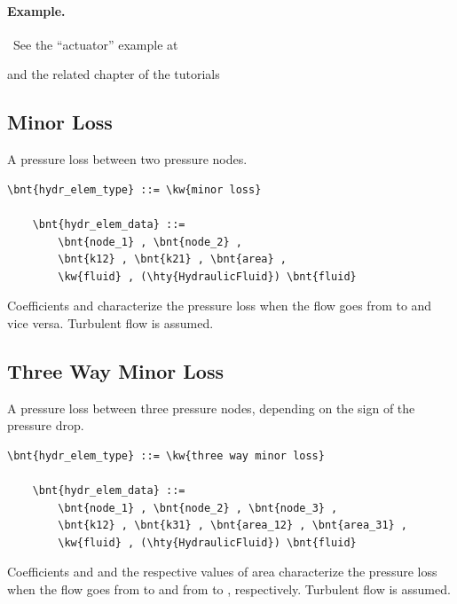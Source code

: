 \paragraph{Example.} \
See the ``actuator'' example at
\begin{quote}
\end{quote}
and the related chapter of the tutorials
\begin{quote}
\end{quote}



\subsection{Minor Loss}
A pressure loss between two pressure nodes.
\label{sec:EL:HYDR:MINOR_LOSS}
\begin{Verbatim}[commandchars=\\\{\}]
    \bnt{hydr_elem_type} ::= \kw{minor loss}

    \bnt{hydr_elem_data} ::=
        \bnt{node_1} , \bnt{node_2} ,
        \bnt{k12} , \bnt{k21} , \bnt{area} ,
        \kw{fluid} , (\hty{HydraulicFluid}) \bnt{fluid}
\end{Verbatim}
Coefficients  and  characterize the pressure loss
when the flow goes from \nt{node\_1} to \nt{node\_2} and vice versa.
Turbulent flow is assumed.



\subsection{Three Way Minor Loss}
A pressure loss between three pressure nodes,
depending on the sign of the pressure drop.
\label{sec:EL:HYDR:THREE_WAY_MINOR_LOSS}
\begin{Verbatim}[commandchars=\\\{\}]
    \bnt{hydr_elem_type} ::= \kw{three way minor loss}

    \bnt{hydr_elem_data} ::=
        \bnt{node_1} , \bnt{node_2} , \bnt{node_3} ,
        \bnt{k12} , \bnt{k31} , \bnt{area_12} , \bnt{area_31} ,
        \kw{fluid} , (\hty{HydraulicFluid}) \bnt{fluid}
\end{Verbatim}
Coefficients  and  and the respective values of area
characterize the pressure loss when the flow goes
from  to  and from  to ,
respectively.
Turbulent flow is assumed.



